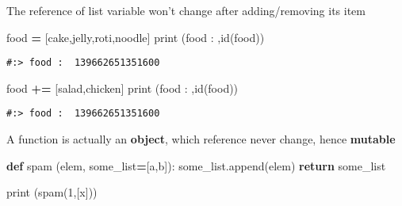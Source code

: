 \documentclass[
]{book}
\newenvironment{Shaded}{\begin{snugshade}}{\end{snugshade}}
\newcommand{\BuiltInTok}[1]{#1}
\newcommand{\ControlFlowTok}[1]{\textcolor[rgb]{0.27,0.27,0.27}{\textbf{#1}}}
\newcommand{\DecValTok}[1]{\textcolor[rgb]{0.06,0.06,0.06}{#1}}
\newcommand{\KeywordTok}[1]{\textcolor[rgb]{0.27,0.27,0.27}{\textbf{#1}}}
\newcommand{\NormalTok}[1]{#1}
\newcommand{\OperatorTok}[1]{\textcolor[rgb]{0.43,0.43,0.43}{\textbf{#1}}}
\newcommand{\StringTok}[1]{\textcolor[rgb]{0.5,0.5,0.5}{#1}}
\begin{document}
The reference of list variable won't change after adding/removing its item

\begin{Shaded}
\begin{Highlighting}[]
\NormalTok{food }\OperatorTok{=}\NormalTok{ [}\StringTok{\textquotesingle{}cake\textquotesingle{}}\NormalTok{,}\StringTok{\textquotesingle{}jelly\textquotesingle{}}\NormalTok{,}\StringTok{\textquotesingle{}roti\textquotesingle{}}\NormalTok{,}\StringTok{\textquotesingle{}noodle\textquotesingle{}}\NormalTok{]}
\BuiltInTok{print}\NormalTok{ (}\StringTok{\textquotesingle{}food : \textquotesingle{}}\NormalTok{,}\BuiltInTok{id}\NormalTok{(food))}
\end{Highlighting}
\end{Shaded}

\begin{verbatim}
#:> food :  139662651351600
\end{verbatim}

\begin{Shaded}
\begin{Highlighting}[]
\NormalTok{food }\OperatorTok{+=}\NormalTok{ [}\StringTok{\textquotesingle{}salad\textquotesingle{}}\NormalTok{,}\StringTok{\textquotesingle{}chicken\textquotesingle{}}\NormalTok{]}
\BuiltInTok{print}\NormalTok{ (}\StringTok{\textquotesingle{}food : \textquotesingle{}}\NormalTok{,}\BuiltInTok{id}\NormalTok{(food))}
\end{Highlighting}
\end{Shaded}

\begin{verbatim}
#:> food :  139662651351600
\end{verbatim}

A function is actually an \textbf{object}, which reference never change, hence \textbf{mutable}

\begin{Shaded}
\begin{Highlighting}[]
\KeywordTok{def}\NormalTok{ spam (elem, some\_list}\OperatorTok{=}\NormalTok{[}\StringTok{\textquotesingle{}a\textquotesingle{}}\NormalTok{,}\StringTok{\textquotesingle{}b\textquotesingle{}}\NormalTok{]):}
\NormalTok{    some\_list.append(elem)}
    \ControlFlowTok{return}\NormalTok{ some\_list}

\BuiltInTok{print}\NormalTok{ (spam(}\DecValTok{1}\NormalTok{,[}\StringTok{\textquotesingle{}x\textquotesingle{}}\NormalTok{]))}
\end{Highlighting}
\end{Shaded}
\end{document}
